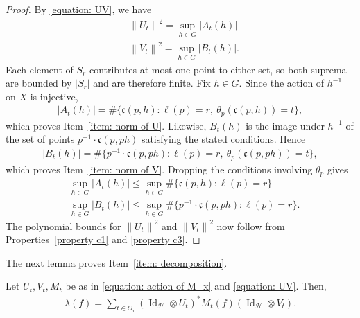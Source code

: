 \documentclass[12pt,reqno]{amsart}
\newcommand{\norm}[1]{\left\|#1\right\|}
\newcommand{\Id}{\operatorname{Id}}
\newcommand{\Hil}{\mathcal{H}}
\numberwithin{equation}{section}
\begin{document}
\begin{proof}
By \eqref{equation: UV}, we have
\begin{align*}
    &\norm{U_t}^2=\sup_{h\in G}|A_t(h)|\\
    &\norm{V_t}^2=\sup_{h\in G}|B_t(h)|.
\end{align*}
Each element of $S_r$ contributes at most one point to either set, so both suprema are bounded by $|S_r|$ and are therefore finite. Fix $h\in G$. Since the action of $h^{-1}$ on $X$ is injective,
\begin{align*}
    |A_t(h)|=\#\{\mathfrak{c}(p,h):\ell(p)=r,\ \theta_p(\mathfrak{c}(p,h))=t\},
\end{align*}
which proves Item~\ref{item: norm of U}. Likewise, $B_t(h)$ is the image under $h^{-1}$ of the set of points $p^{-1}\cdot\mathfrak{c}(p,ph)$ satisfying the stated conditions. Hence
\begin{align*}
    |B_t(h)|=\#\{p^{-1}\cdot\mathfrak{c}(p,ph):\ell(p)=r,\ \theta_p(\mathfrak{c}(p,ph))=t\},
\end{align*}
which proves Item~\ref{item: norm of V}. Dropping the conditions involving $\theta_p$ gives
\begin{align*}
    &\sup_{h\in G}|A_t(h)|\le \sup_{h\in G}\#\{\mathfrak{c}(p,h): \ell(p)=r\}\\
    &\sup_{h\in G}|B_t(h)|\le \sup_{h\in G}\#\{p^{-1}\cdot \mathfrak{c}(p,ph):\ell(p)=r\}.
\end{align*}
The polynomial bounds for $\norm{U_t}^2$ and $\norm{V_t}^2$ now follow from Properties~\ref{property c1} and \ref{property c3}.
\end{proof}
The next lemma proves Item~\ref{item: decomposition}.
\begin{lemma}\label{lemma: decomposition of lambda f}
    Let $U_t,V_t,M_t$ be as in \eqref{equation: action of M_x} and \eqref{equation: UV}. Then,
    \begin{align}\label{equation: Item decomposition in the lemma}
        \lambda(f)=\sum_{t\in \Theta_r} (\Id_{\Hil}\otimes U_t)^* M_{t}(f)(\Id_{\Hil}\otimes V_t).
    \end{align}
\end{lemma}
\end{document}
